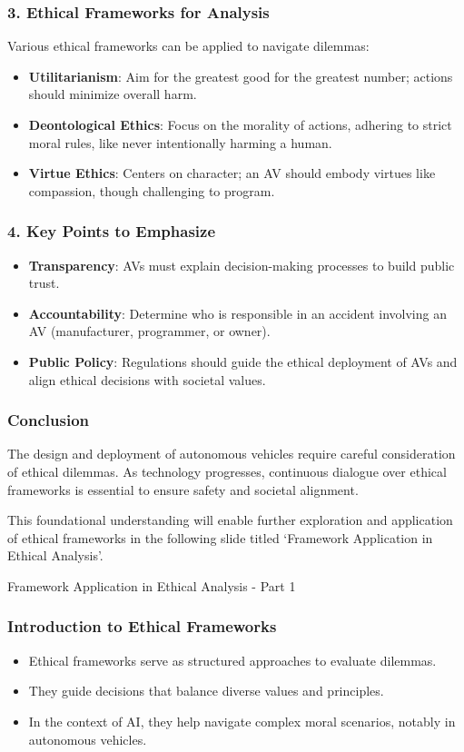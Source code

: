 \documentclass[aspectratio=169]{beamer}
\begin{document}
\begin{frame}[fragile]
    \frametitle{3. Ethical Frameworks for Analysis}
    Various ethical frameworks can be applied to navigate dilemmas:
    \begin{itemize}
        \item \textbf{Utilitarianism}: Aim for the greatest good for the greatest number; actions should minimize overall harm.
        \item \textbf{Deontological Ethics}: Focus on the morality of actions, adhering to strict moral rules, like never intentionally harming a human.
        \item \textbf{Virtue Ethics}: Centers on character; an AV should embody virtues like compassion, though challenging to program.
    \end{itemize}
\end{frame}

\begin{frame}[fragile]
    \frametitle{4. Key Points to Emphasize}
    \begin{itemize}
        \item \textbf{Transparency}: AVs must explain decision-making processes to build public trust.
        \item \textbf{Accountability}: Determine who is responsible in an accident involving an AV (manufacturer, programmer, or owner).
        \item \textbf{Public Policy}: Regulations should guide the ethical deployment of AVs and align ethical decisions with societal values.
    \end{itemize}
\end{frame}

\begin{frame}[fragile]
    \frametitle{Conclusion}
    The design and deployment of autonomous vehicles require careful consideration of ethical dilemmas. As technology progresses, continuous dialogue over ethical frameworks is essential to ensure safety and societal alignment.
    
    \alert{This foundational understanding will enable further exploration and application of ethical frameworks in the following slide titled `Framework Application in Ethical Analysis'.}
\end{frame}

\begin{frame}[fragile]{Framework Application in Ethical Analysis - Part 1}
    \frametitle{Introduction to Ethical Frameworks}
    \begin{itemize}
        \item Ethical frameworks serve as structured approaches to evaluate dilemmas.
        \item They guide decisions that balance diverse values and principles.
        \item In the context of AI, they help navigate complex moral scenarios, notably in autonomous vehicles.
    \end{itemize}
\end{frame}
\end{document}
